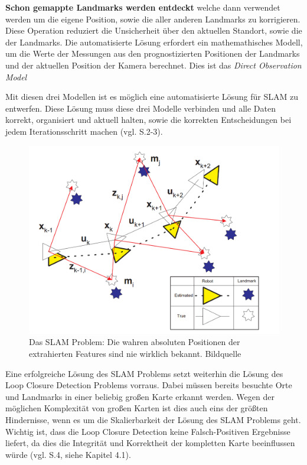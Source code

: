 \textbf{Schon gemappte Landmarks werden entdeckt} welche dann verwendet werden um die eigene Position, sowie die aller anderen Landmarks zu korrigieren. Diese Operation reduziert die Unsicherheit über den aktuellen Standort, sowie die der Landmarks. Die automatisierte Lösung erfordert ein mathemathisches Modell, um die Werte der Messungen aus den prognostizierten Positionen der Landmarks und der aktuellen Position der Kamera berechnet. Dies ist das \glqq \textit{Direct Observation Model}\grqq

Mit diesen drei Modellen ist es möglich eine automatisierte Lösung für SLAM zu entwerfen. Diese Lösung muss diese drei Modelle verbinden und alle Daten korrekt, organisiert und aktuell halten, sowie die korrekten Entscheidungen bei jedem Iterationsschritt machen (vgl. \cite{ekf_slam} S.2-3).

\begin{figure}[H]
	\centering
	\includegraphics[scale=0.5]{slam_problem.png}
	\caption{Das SLAM Problem: Die wahren absoluten Positionen der extrahierten Features sind nie wirklich bekannt. Bildquelle \cite{slam}}
\end{figure} 

Eine erfolgreiche Lösung des SLAM Problems setzt weiterhin die Lösung des \glqq Loop Closure Detection\grqq{} Problems vorraus. Dabei müssen bereits besuchte Orte und Landmarks in einer beliebig großen Karte erkannt werden. Wegen der möglichen Komplexität von großen Karten ist dies auch eins der größten Hindernisse, wenn es um die Skalierbarkeit der Lösung des SLAM Problems geht. Wichtig ist, dass die Loop Closure Detection keine Falsch-Positiven Ergebnisse liefert, da dies die Integrität und Korrektheit der kompletten Karte beeinflussen würde (vgl. \cite{ar_slam} S.4, siehe Kapitel 4.1).

